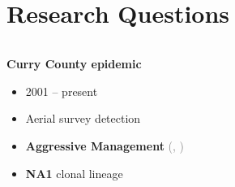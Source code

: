 \documentclass{beamer}\usepackage[]{graphicx}\usepackage[]{color}
\newcommand{\mycitep}[1]{\scriptsize{\textcolor{gray}{(\citeauthor{#1}, \citeyear{#1})}}}
\begin{document}
\section{Research Questions}
\begin{frame}[allowpagebreak,T]
\begin{columns}[allowpagebreak,T]
	\begin{column}{0.5\textwidth}
		\begin{center}
			\Large{\bf Curry County epidemic}
		\end{center}
		\begin{itemize}
			\item 2001 -- present
			\item Aerial survey detection
			\item \textbf{Aggressive Management} {\mycitep{hansen2008epidemiology}}
			\item \textbf{NA1} clonal lineage
		\end{itemize}
		\begin{center}
			\color{mygreen}
		\end{center}
		\begin{enumerate}[<+->]
		\end{enumerate}
	\end{column}
	\begin{column}{0.5\textwidth}\centering

\end{column}
\end{columns}
\end{frame}
\end{document}
